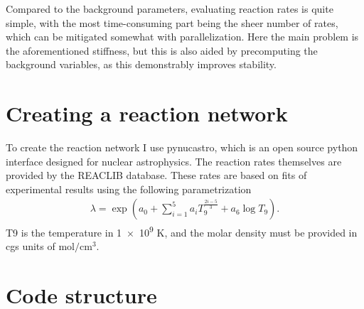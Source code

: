 Compared to the background parameters, evaluating reaction rates is quite simple, with the most time-consuming part being the sheer number of rates, which can be mitigated somewhat with parallelization. Here the main problem is the aforementioned stiffness, but this is also aided by precomputing the background variables, as this demonstrably improves stability. 


\section{Creating a reaction network}
\label{sec:pna}
To create the reaction network I use pynucastro\cite{pynucastro2}, which is an open source python interface designed for nuclear astrophysics. The reaction rates themselves are provided by the REACLIB database\cite{REACLIB}. These rates are based on fits of experimental results using the following parametrization 
\begin{align}
    \lambda = \exp\left(a_0+\sum_{i=1}^{5}a_i T_9^{\frac{2i-5}{3}}+a_6 \log{T_9}\right).
\end{align}
T9 is the temperature in \num{1e9} K, and the molar density must be provided in cgs units of $\text{mol}/\text{cm}^3$. 



\section{Code structure}
\label{sec:structure}